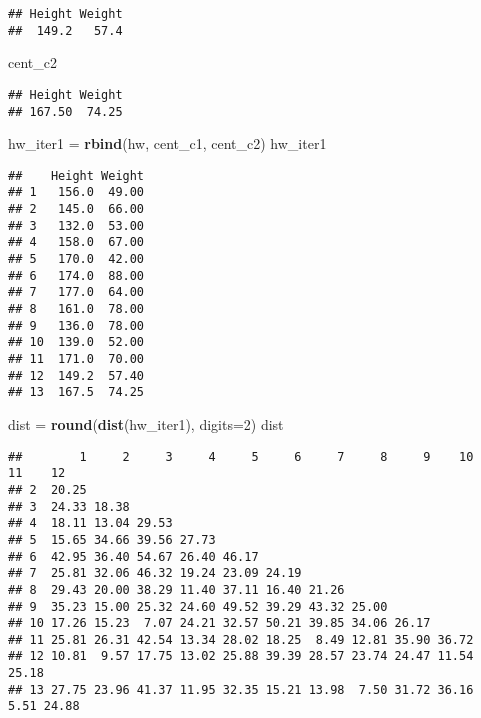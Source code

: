 \documentclass[
]{article}
\newenvironment{Shaded}{\begin{snugshade}}{\end{snugshade}}
\newcommand{\DataTypeTok}[1]{\textcolor[rgb]{0.13,0.29,0.53}{#1}}
\newcommand{\DecValTok}[1]{\textcolor[rgb]{0.00,0.00,0.81}{#1}}
\newcommand{\KeywordTok}[1]{\textcolor[rgb]{0.13,0.29,0.53}{\textbf{#1}}}
\newcommand{\NormalTok}[1]{#1}
\newcommand{\StringTok}[1]{\textcolor[rgb]{0.31,0.60,0.02}{#1}}
\begin{document}
\begin{verbatim}
## Height Weight 
##  149.2   57.4
\end{verbatim}

\begin{Shaded}
\begin{Highlighting}[]
\NormalTok{cent_c2}
\end{Highlighting}
\end{Shaded}

\begin{verbatim}
## Height Weight 
## 167.50  74.25
\end{verbatim}

\begin{Shaded}
\begin{Highlighting}[]
\NormalTok{hw_iter1 =}\StringTok{ }\KeywordTok{rbind}\NormalTok{(hw, cent_c1, cent_c2)}
\NormalTok{hw_iter1}
\end{Highlighting}
\end{Shaded}

\begin{verbatim}
##    Height Weight
## 1   156.0  49.00
## 2   145.0  66.00
## 3   132.0  53.00
## 4   158.0  67.00
## 5   170.0  42.00
## 6   174.0  88.00
## 7   177.0  64.00
## 8   161.0  78.00
## 9   136.0  78.00
## 10  139.0  52.00
## 11  171.0  70.00
## 12  149.2  57.40
## 13  167.5  74.25
\end{verbatim}

\begin{Shaded}
\begin{Highlighting}[]
\NormalTok{dist =}\StringTok{ }\KeywordTok{round}\NormalTok{(}\KeywordTok{dist}\NormalTok{(hw_iter1), }\DataTypeTok{digits=}\DecValTok{2}\NormalTok{)}
\NormalTok{dist}
\end{Highlighting}
\end{Shaded}

\begin{verbatim}
##        1     2     3     4     5     6     7     8     9    10    11    12
## 2  20.25                                                                  
## 3  24.33 18.38                                                            
## 4  18.11 13.04 29.53                                                      
## 5  15.65 34.66 39.56 27.73                                                
## 6  42.95 36.40 54.67 26.40 46.17                                          
## 7  25.81 32.06 46.32 19.24 23.09 24.19                                    
## 8  29.43 20.00 38.29 11.40 37.11 16.40 21.26                              
## 9  35.23 15.00 25.32 24.60 49.52 39.29 43.32 25.00                        
## 10 17.26 15.23  7.07 24.21 32.57 50.21 39.85 34.06 26.17                  
## 11 25.81 26.31 42.54 13.34 28.02 18.25  8.49 12.81 35.90 36.72            
## 12 10.81  9.57 17.75 13.02 25.88 39.39 28.57 23.74 24.47 11.54 25.18      
## 13 27.75 23.96 41.37 11.95 32.35 15.21 13.98  7.50 31.72 36.16  5.51 24.88
\end{verbatim}
\end{document}

